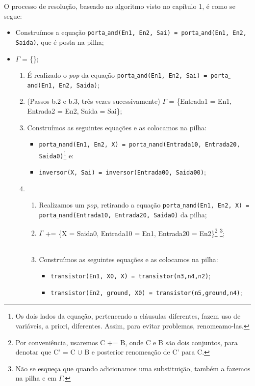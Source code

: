 \documentclass{article}
\theoremstyle{definition}
\theoremstyle{remark}
\begin{document}
O processo de resolução, baseado no algoritmo visto no capítulo 1, é como se segue:

\begin{itemize}
  \item Construímos a equação {\tt porta$\_$and(En1, En2, Sai) = porta$\_$and(En1, En2, Saida)}, que é posta na pilha;
  \item $\Gamma$ = \{\};
    \begin{enumerate}
      \item É realizado o \textit{pop} da equação {\tt porta$\_$and(En1, En2, Sai) = porta$\_$and(En1, En2, Saida)};
      \item (Passos b.2 e b.3, três vezes sucessivamente) $\Gamma$ = \{Entrada1 = En1, Entrada2 = En2, Saida = Sai\}; %
      \item Construímos as seguintes equações e as colocamos na pilha:
        \begin{itemize}
          \item {\tt porta$\_$nand(En1, En2, X) = porta$\_$nand(Entrada10, Entrada20, Saida0)}\footnote{Os dois lados da equação, pertencendo a cláusulas diferentes, fazem uso de variáveis, a priori, diferentes. Assim, para evitar problemas, renomeamo-las.} e:
          \item {\tt inversor(X, Sai) = }{\tt inversor(Entrada00, Saida00)};
        \end{itemize}
      \item
        \begin{enumerate}
          \item Realizamos um \textit{pop}, retirando a equação {\tt porta$\_$nand(En1, En2, X) = porta$\_$nand(Entrada10, Entrada20, Saida0)} da pilha;
          \item $\Gamma$ += \{X = Saida0, Entrada10 = En1, Entrada20 = En2\}\footnote{Por conveniência, usaremos C += B, onde C e B são dois conjuntos, para denotar que C' = C $\cup$ B e posterior renomeação de C' para C.} \footnote{Não se esqueça que quando adicionamos uma substituição, também a fazemos na pilha e em $\Gamma$.};
          \item Construímos as seguintes equações e as colocamos na pilha:
            \begin{itemize}
              \item {\tt transistor(En1, X0, X) = transistor(n3,n4,n2)};
              \item {\tt transistor(En2, ground, X0) = transistor(n5,ground,n4)};

\end{itemize}
\end{enumerate}
\end{enumerate}
\end{itemize}
\end{document}
